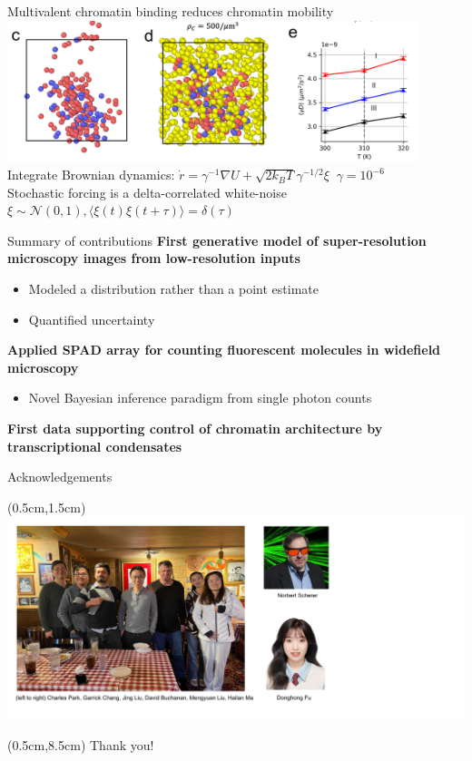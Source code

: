 \documentclass{beamer}					%
\begin{document}
\begin{frame}{Multivalent chromatin binding reduces chromatin mobility}
\includegraphics[width=12cm]{../../brd4/brd4/media/MD-2}
Integrate Brownian dynamics: $\dot{r} = \gamma^{-1}\nabla U + \sqrt{2 k_{B}T}\gamma^{-1/2}\xi \;\; \gamma = 10^{-6}$\\
\vspace{1cm}
Stochastic forcing is a delta-correlated white-noise $\xi \sim \mathcal{N}(0,1), \langle \xi(t)\xi(t+\tau)\rangle = \delta(\tau)$
\end{frame}

\begin{frame}{Summary of contributions}
\textbf{First generative model of super-resolution microscopy images from low-resolution inputs}
\begin{itemize}
\item Modeled a distribution rather than a point estimate
\item Quantified uncertainty
\end{itemize}
\textbf{Applied SPAD array for counting fluorescent molecules in widefield microscopy}
\begin{itemize}
\item Novel Bayesian inference paradigm from single photon counts
\end{itemize}
\textbf{First data supporting control of chromatin architecture by transcriptional condensates}

\end{frame}


\begin{frame}{Acknowledgements}
\begin{textblock*}{16cm}(0.5cm,1.5cm)
\includegraphics[width=16cm]{../../dissertation/dissertation/media/Lab.png}
\end{textblock*}

\begin{textblock*}{14cm}(0.5cm,8.5cm)
Thank you!
\end{textblock*}

\end{frame}
\end{document}
